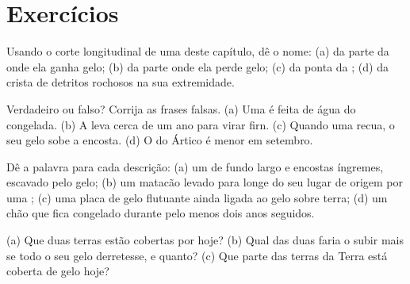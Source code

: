 \section{Exercícios}

\begin{exercise}[$\star$]\label{exo:g8:ice-on-earth:1}
Usando o corte longitudinal de uma  deste capítulo, dê o nome:
(a) da parte da  onde ela ganha gelo; (b) da parte onde ela perde
gelo; (c) da ponta da ; (d) da crista de detritos rochosos na sua
extremidade.
\end{exercise}

\begin{exercise}[$\star$]\label{exo:g8:ice-on-earth:2}
Verdadeiro ou falso? Corrija as frases falsas. (a) Uma  é feita de
água do  congelada. (b) A  leva cerca de um ano para virar firn.
(c) Quando uma  recua, o seu gelo sobe a encosta. (d) O  do Ártico é menor em setembro.
\end{exercise}

\begin{exercise}[$\star$]\label{exo:g8:ice-on-earth:3}
Dê a palavra para cada descrição: (a) um  de fundo largo e encostas
íngremes, escavado pelo gelo; (b) um matacão levado para longe do seu
lugar de origem por uma ; (c) uma placa de gelo flutuante ainda
ligada ao gelo sobre terra; (d) um chão que fica congelado durante pelo
menos dois anos seguidos.
\end{exercise}

\begin{exercise}[$\star$]\label{exo:g8:ice-on-earth:4}
(a) Que duas terras estão cobertas por  hoje? (b) Qual das
duas faria o  subir mais se todo o seu gelo derretesse, e quanto?
(c) Que parte das terras da Terra está coberta de gelo hoje?
\end{exercise}

